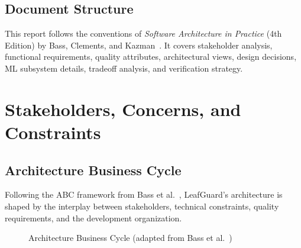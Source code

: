 \documentclass[11pt,a4paper,oneside]{report}
\begin{document}
\section{Document Structure}

This report follows the conventions of \textit{Software Architecture in Practice} (4th Edition) by Bass, Clements, and Kazman~\cite{bass2024}. It covers stakeholder analysis, functional requirements, quality attributes, architectural views, design decisions, ML subsystem details, tradeoff analysis, and verification strategy.


\chapter{Stakeholders, Concerns, and Constraints}

\section{Architecture Business Cycle}

Following the ABC framework from Bass et al.~\cite{bass2024}, LeafGuard's architecture is shaped by the interplay between stakeholders, technical constraints, quality requirements, and the development organization.

\begin{figure}[H]
\centering
{}
\caption{Architecture Business Cycle (adapted from Bass et al.~\cite{bass2024})}
\label{fig:abc}
\end{figure}
\end{document}
